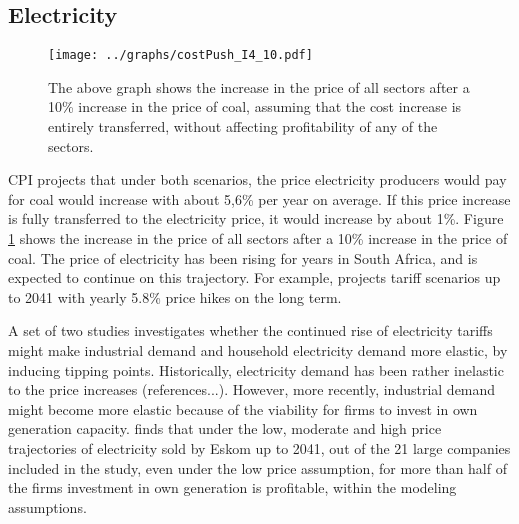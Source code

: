 \documentclass[12pt,english]{article}
\begin{document}
\subsection{Electricity}\label{elec}

\begin{figure}[!t]
	\hspace{-10pt}\texttt{[image: ../graphs/costPush\_I4\_10.pdf]}
	\caption{\label{costPush_I4_10} The above graph shows the increase in the price of all sectors after a 10\% increase in the price of coal, assuming that the cost increase is entirely transferred, without affecting profitability of any of the sectors.}
\end{figure}

CPI projects that under both scenarios, the price electricity producers would pay for coal would increase with about 5,6\% per year on average. If this price increase is fully transferred to the electricity price, it would increase by about 1\%. Figure \ref{costPush_I4_10} shows the increase in the price of all sectors after a 10\% increase in the price of coal. %
The price of electricity has been rising for years in South Africa, and is expected to continue on this trajectory. For example, \citep{goliger2018electricity} projects tariff scenarios up to 2041 with yearly 5.8\% price hikes on the long term.

A set of two studies investigates whether the continued rise of electricity tariffs might make industrial demand \citep{goliger2018electricity} and household electricity demand \citep{goliger2018household} more elastic, by inducing tipping points. Historically, electricity demand has been rather inelastic to the price increases (references...). However, more recently, industrial demand might become more elastic because of the viability for firms to invest in own generation capacity. \citep{goliger2018electricity} finds that under the low, moderate and high price trajectories of electricity sold by Eskom up to 2041, out of the 21 large companies included in the study, even under the low price assumption, for more than half of the firms investment in own generation is profitable, within the modeling assumptions.



\end{document}
